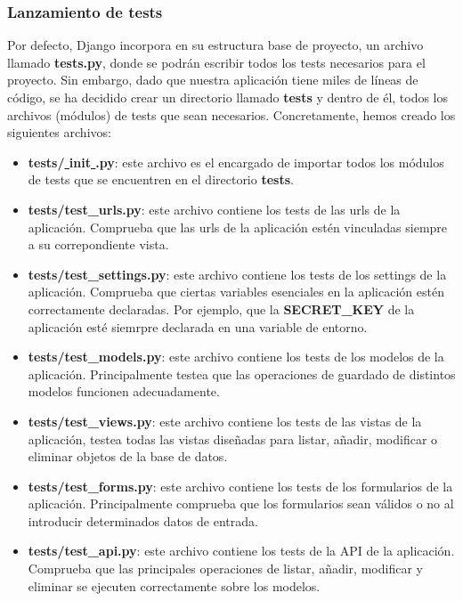 \subsubsection{Lanzamiento de tests}
Por defecto, Django incorpora en su estructura base de proyecto, un archivo llamado
\textbf{tests.py}, donde se podrán escribir todos los tests necesarios para el proyecto.
Sin embargo, dado que nuestra aplicación tiene miles de líneas de código, se ha decidido
crear un directorio llamado \textbf{tests} y dentro de él, todos los archivos (módulos) de
tests que sean necesarios. Concretamente, hemos creado los siguientes archivos:

    \begin{itemize}
        \item \textbf{tests/\underline{  }init\underline{  }.py}: este archivo es el
        encargado de importar todos los módulos de tests que se encuentren en el
        directorio \textbf{tests}.
        \item \textbf{tests/test\_urls.py}: este archivo contiene los tests de las urls de la
        aplicación. Comprueba que las urls de la aplicación estén vinculadas siempre a su
        correpondiente vista.
        \item \textbf{tests/test\_settings.py}: este archivo contiene los tests de los settings
        de la aplicación. Comprueba que ciertas variables esenciales en la aplicación
        estén correctamente declaradas. Por ejemplo, que la \textbf{SECRET\_KEY} de la
        aplicación esté siemrpre declarada en una variable de entorno.
        \item \textbf{tests/test\_models.py}: este archivo contiene los tests de los modelos
        de la aplicación. Principalmente testea que las operaciones de guardado de distintos
        modelos funcionen adecuadamente.
        \item \textbf{tests/test\_views.py}: este archivo contiene los tests de las vistas
        de la aplicación, testea todas las vistas diseñadas para listar, añadir, modificar o
        eliminar objetos de la base de datos.
        \item \textbf{tests/test\_forms.py}: este archivo contiene los tests de los formularios
        de la aplicación. Principalmente comprueba que los formularios sean válidos o no
        al introducir determinados datos de entrada.
        \item \textbf{tests/test\_api.py}: este archivo contiene los tests de la API de la
        aplicación. Comprueba que las principales operaciones de listar, añadir, modificar y
        eliminar se ejecuten correctamente sobre los modelos.
    \end{itemize}

